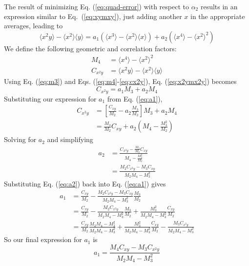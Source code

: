 \documentclass[oneside]{tufte-handout}
\begin{document}
\begin{fullwidth}
The result of minimizing Eq. (\ref{eq:quad-error}) with respect to $\alpha_2$ results in an expression similar to Eq.~(\ref{eq:xymxy}), just adding another $x$ in the appropriate averages, leading to
\begin{equation}\label{eq:x2ymx2y}
\langle x^2 y \rangle - \langle x^2 \rangle \langle y \rangle = a_1 (\langle x^3 \rangle - \langle x^2 \rangle \langle x \rangle) + a_2 (\langle x^4 \rangle - \langle x^2 \rangle^2)
\end{equation}
We define the following geometric and correlation factors:
\begin{align}
M_4 &= \langle x^4 \rangle - \langle x^2 \rangle^2 \label{eq:m4} \\
C_{x^2y} &= \langle x^2 y \rangle - \langle x^2 \rangle \langle y \rangle \label{eq:cx2y}
\end{align}
Using Eq. (\ref{eq:m3}) and Eqs. (\ref{eq:m4}-\ref{eq:cx2y}), Eq. (\ref{eq:x2ymx2y}) becomes
\begin{equation*}
C_{x^2y} = a_1 M_3 + a_2 M_4
\end{equation*}
Substituting our expression for $a_1$ from Eq. (\ref{eq:a1}),
\begin{align}
C_{x^2y} &= \left[
     \frac{C_{xy}}{M_2} - a_2 \frac{M_3}{M_2}
     \right] M_3 + a_2 M_4 \\
     &= \frac{M_3}{M_2} C_{xy} + a_2 (M_4 - \frac{M_3^2}{M_2})
\end{align}
Solving for $a_2$ and simplifying
\begin{align}
a_2 &= \frac{
        C_{x^2y} - \frac{M_3}{M_2} C_{xy}
     }{
        M_4 - \frac{M_3^2}{M_2}
     } \\
     &= \frac{
        M_2 C_{x^2y} - M_3 C_{xy}
     }{
        M_2 M_4 - M_3^2
     } \label{eq:a2}
\end{align}
Substituting Eq. (\ref{eq:a2}) back into Eq. (\ref{eq:a1}) gives
\begin{align*}
a_1 &= \frac{C_{xy}}{M_2} - \frac{
        M_2 C_{x^2y} - M_3 C_{xy}
     }{
        M_2 M_4 - M_3^2
     } \frac{M_3}{M_2} \\
     &= \frac{C_{xy}}{M_2} 
         - \frac{M_2 C_{x^2y}}{M_2 M_4 - M_3^2} \frac{M_3}{M_2} 
         + \frac{M_3^2 }{M_2 M_4 - M_3^2} \frac{C_{xy}}{M_2} \\
     &= \frac{C_{xy}}{M_2} \frac{M_2 M_4 - M_3^2}{M_2 M_4 - M_3^2}
         + \frac{M_3^2 }{M_2 M_4 - M_3^2} \frac{C_{xy}}{M_2} 
         - \frac{M_3 C_{x^2y}}{M_2 M_4 - M_3^2}
\end{align*}
So our final expression for $a_1$ is
\begin{equation}\label{eq:a1-final}
	a_1     =  \frac{M_4 C_{xy} - M_3 C_{x^2y}}{M_2 M_4 - M_3^2}
\end{equation}


\end{fullwidth}
\end{document}
